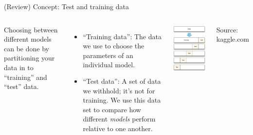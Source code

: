 \documentclass[aspectratio=169]{beamer}
\begin{document}
\begin{frame}{(Review) Concept:  Test and training data}


\begin{columns}


Choosing between different models can be done by partitioning your data in to ``training'' and ``test'' data.

\begin{itemize}
\item ``Training data'': The data we use to choose the parameters of an individual model. 

\hspace{5mm}

\item ``Test data'': A set of data we withhold; it's not for training.  We use this data set to compare how different \textit{models} perform relative to one another.  

\end{itemize}

\includegraphics[scale=0.35]{figures/07_cross_validation_diagram}
\begin{tiny}
Source: kaggle.com
\end{tiny}
\end{columns}


\end{frame}
\end{document}
